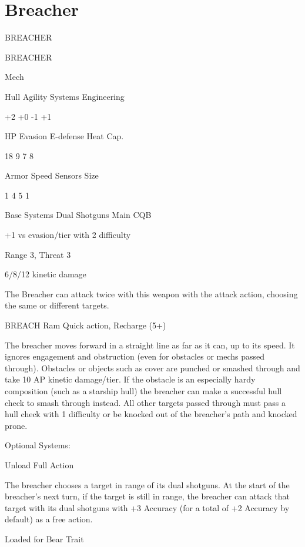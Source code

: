 \section{Breacher}

                                              BREACHER  

 BREACHER 

 Mech 

 Hull       Agility      Systems       Engineering 

 +2         +0           -1            +1 

 HP         Evasion      E-defense     Heat Cap. 

 18         9            7             8 

 Armor      Speed        Sensors       Size 

 1          4            5             1 

Base Systems  
Dual Shotguns  
Main CQB
 
+1 vs evasion/tier with 2 difficulty
 
Range 3, Threat 3
 
6/8/12 kinetic damage
 
The Breacher can attack twice with this weapon with the attack action, choosing the same or  
different targets.
 

BREACH Ram  
Quick action, Recharge (5+)
 
The breacher moves forward in a straight line as far as it can, up to its speed. It ignores  
engagement and obstruction (even for obstacles or mechs passed through). Obstacles or  
objects such as cover are punched or smashed through and take 10 AP kinetic damage/tier. If  
the obstacle is an especially hardy composition (such as a starship hull) the breacher can make a  
successful hull check to smash through instead. All other targets passed through must pass a  
hull check with 1 difficulty or be knocked out of the breacher’s path and knocked prone.
 

Optional Systems:
 
Unload  
Full Action
 
The breacher chooses a target in range of its dual shotguns. At the start of the breacher’s next  
turn, if the target is still in range, the breacher can attack that target with its dual shotguns with  
+3 Accuracy (for a total of +2 Accuracy by default) as a free action.
 

Loaded for Bear  
Trait
 

